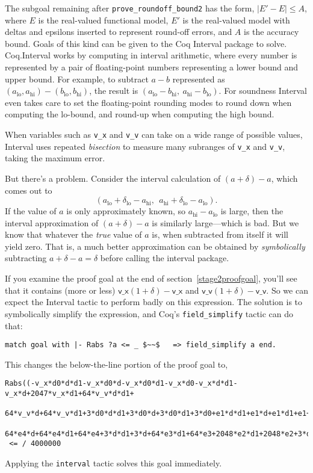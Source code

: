 \documentclass[article]{memoir}
\begin{document}
The subgoal remaining after \lstinline{prove_roundoff_bound2} has the
form, $|E'-E|\le A$, where $E$ is the real-valued functional model,
$E'$ is the real-valued model with deltas and epsilons inserted to
represent round-off errors, and $A$ is the accuracy bound.
Goals of this kind can be given to the Coq Interval package to solve.
Coq.Interval works by computing in interval arithmetic,
where every number is represented by a pair of floating-point numbers
representing a lower bound and upper bound.  For example, to subtract
$a-b$ represented as $(a_\mathrm{lo},a_\mathrm{hi})-(b_\mathrm{lo},b_\mathrm{hi})$,
the result is $(a_\mathrm{lo}-b_\mathrm{hi},~a_\mathrm{hi}-b_\mathrm{lo})$.
For soundness Interval even takes care to set the floating-point rounding modes
to round down when computing the lo-bound, and round-up when computing
the high bound.

When variables such as \lstinline{v_x} and \lstinline{v_v} can
take on a wide range of possible values, Interval uses
repeated \emph{bisection} to measure many subranges
of \lstinline{v_x} and \lstinline{v_v}, taking the maximum error.

But there's a problem.  Consider the interval calculation of
$(a+\delta)-a$, which comes out to
\[(a_\mathrm{lo}+\delta_\mathrm{lo}-a_\mathrm{hi},~~a_\mathrm{hi}+\delta_\mathrm{lo}-a_\mathrm{lo}).\]
If the value of $a$ is only approximately known, so
$a_\mathrm{hi}-a_\mathrm{lo}$ is large, then the interval approximation
of $(a+\delta)-a$ is similarly large---which is bad.  But we know that whatever the \emph{true} value of $a$ is, when subtracted from itself it will yield zero.
That is, a much better approximation can be obtained by
\emph{symbolically} subtracting $a+\delta-a=\delta$
before calling the interval package.

If you examine the proof goal at the end of section~\ref{stage2proofgoal},
you'll see that it contains (more or less)
$\mathsf{v\_x}(1+\delta)-\mathsf{v\_x}$ and
$\mathsf{v\_v}(1+\delta)-\mathsf{v\_v}$.  So we can expect the Interval
tactic to perform badly on this expression.
The solution is to symbolically simplify the expression,
and Coq's \lstinline{field_simplify} tactic can do that:

\begin{lstlisting}
match goal with |- Rabs ?a <= _ $~~$   => field_simplify a end.
\end{lstlisting}
This changes the below-the-line portion of the proof goal to,
\begin{lstlisting}
Rabs((-v_x*d0*d*d1-v_x*d0*d-v_x*d0*d1-v_x*d0-v_x*d*d1-v_x*d+2047*v_x*d1+64*v_v*d*d1+
   64*v_v*d+64*v_v*d1+3*d0*d*d1+3*d0*d+3*d0*d1+3*d0+e1*d*d1+e1*d+e1*d1+e1+64*e4*d*d1+
   64*e4*d+64*e4*d1+64*e4+3*d*d1+3*d+64*e3*d1+64*e3+2048*e2*d1+2048*e2+3*d1+2048*e0)/2048)
 <= / 4000000
\end{lstlisting}
Applying the \lstinline{interval} tactic solves this goal immediately.
\end{document}
